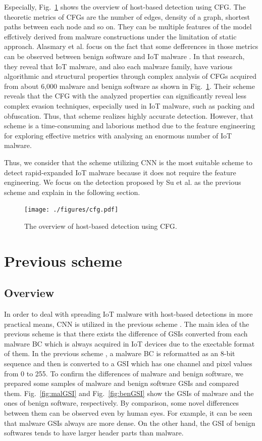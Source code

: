 \documentclass{ieeeaccess}
\newcommand{\myfigurename}{Fig.}
\begin{document}
Especially, \myfigurename~\ref{fig:cfg} shows the overview of host-based detection using CFG.
The theoretic metrics of CFGs are the number of edges, density of a graph, shortest paths between each node and so on.
They can be multiple features of the model effctively derived from malware constructions under the limitation of static approach.
Alasmary et al. focus on the fact that some defferences in those metrics can be observed between benign software and IoT malware \cite{cfg}.
In that research, they reveal that IoT malware, and also each malware family, have various algorithmic and structural properties through complex analysis of CFGs acquired from about 6,000 malware and benign software as shown in \myfigurename~\ref{fig:cfg}.
Their scheme reveals that the CFG with the analyzed properties can significantly reveal less complex evasion techniques, especially used in IoT malware, such as packing and obfuscation.
Thus, that scheme realizes highly accurate detection.
However, that scheme is a time-consuming and laborious method due to the feature engineering for exploring effective metrics with analysing an enormous number of IoT malware.

Thus, we consider that the scheme utilizing CNN is the most suitable scheme to detect rapid-expanded IoT malware because it does not require the feature engineering.
We focus on the detection proposed by Su et al. \cite{previous} as the previous scheme and explain in the following section.
\begin{figure}[t]
 \centering
 \texttt{[image: ./figures/cfg.pdf]}
 \caption{The overview of host-based detection using CFG.} 
 \label{fig:cfg}
\end{figure}

\section{Previous scheme} \label{sec:previous_scheme}
\subsection{Overview} 
In order to deal with spreading IoT malware with host-based detections in more practical means, CNN is utilized in the previous scheme \cite{previous}.
The main idea of the previous scheme is that there exists the difference of GSIs converted from each malware BC which is always acquired in IoT devices due to the exectable format of them.
In the previous scheme \cite{previous}, a malware BC is reformatted as an 8-bit sequence and then is converted to a GSI which has one channel and pixel values from 0 to 255.
To confirm the differences of malware and benign software, we prepared some samples of malware and benign software GSIs and compared them.
\myfigurename~\ref{fig:malGSI} and \myfigurename~\ref{fig:benGSI} show the GSIs of malware and the ones of benign software, respectively.
By comparison, some novel differences between them can be observed even by human eyes.
For example, it can be seen that malware GSIs always are more dense.
On the other hand, the GSI of benign softwares tends to have larger header parts than malware.
\end{document}
